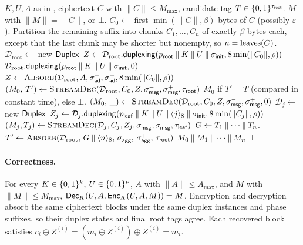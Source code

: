 \begin{algorithm}[t]
  \caption{$\Dec_K(U, A, C \concat T)$.}
  \label{alg:dec}
  \begin{algorithmic}[1]
    \Require $K, U, A$ as in , ciphertext $C$ with $\|C\| \leq M_{\max}$, candidate tag $T \in \{0,1\}^{\tau_{\mathsf{root}}}$.
    \Ensure $M$ with $\|M\| = \|C\|$, or $\bot$.
    \State $C_0 \gets$ first $\min(\|C\|, \beta)$ bytes of $C$ (possibly $\varepsilon$).
    \State Partition the remaining suffix into chunks $C_1, \dots, C_n$ of exactly $\beta$ bytes each, except that the last chunk may be shorter but nonempty, so $n = \operatorname{leaves}(C)$.
    \State $\mathcal{D}_{\text{root}} \gets$ new $\mathsf{Duplex}$
      \State $Z \gets \mathcal{D}_{\text{root}}.\mathsf{duplexing}(p_{\mathsf{root}} \mathbin{\|} K \mathbin{\|} U \mathbin{\|} \sigma_{\mathsf{init}}, 8\min(\|C_0\|, \rho))$
    \Else
      \State $\mathcal{D}_{\text{root}}.\mathsf{duplexing}(p_{\mathsf{root}} \mathbin{\|} K \mathbin{\|} U \mathbin{\|} \sigma_{\mathsf{init}}, 0)$
      \State $Z \gets \Call{Absorb}{\mathcal{D}_{\text{root}}, A, \sigadmore, \sigadlast, 8\min(\|C_0\|, \rho)}$
    \EndIf
      \State $(M_0,\, T') \gets \Call{StreamDec}{\mathcal{D}_{\text{root}}, C_0, Z, \sigmsgmore, \sigmsglast, \tauroot}$
      \State \Return $M_0$ if $T' = T$ (compared in constant time), else $\bot$.
    \EndIf
    \State $(M_0,\, \_) \gets \Call{StreamDec}{\mathcal{D}_{\text{root}}, C_0, Z, \sigmsgmore, \sigmsglast, 0}$
      \State $\mathcal{D}_j \gets$ new $\mathsf{Duplex}$
      \State $Z_j \gets \mathcal{D}_j.\mathsf{duplexing}(p_{\mathsf{leaf}} \mathbin{\|} K \mathbin{\|} U \mathbin{\|} \langle j \rangle_8 \mathbin{\|} \sigma_{\mathsf{init}}, 8\min(\|C_j\|, \rho))$
      \State $(M_j, T_j) \gets \Call{StreamDec}{\mathcal{D}_j, C_j, Z_j, \sigmsgmore, \sigmsglast, \tauleaf}$
    \EndFor
    \State $G \gets T_1 \mathbin{\|} \cdots \mathbin{\|} T_n$.
    \State $T' \gets \Call{Absorb}{\mathcal{D}_{\text{root}},\, G \concat \langle n \rangle_8,\, \sigaggmore,\, \sigagglast,\, \tauroot}$
      \State \Return $M_0 \mathbin{\|} M_1 \mathbin{\|} \cdots \mathbin{\|} M_n$
    \Else
      \State \Return $\bot$
    \EndIf
  \end{algorithmic}
\end{algorithm}

\paragraph{Correctness.}
For every $K \in \{0,1\}^k$, $U \in \{0,1\}^{\nu}$,
$A$ with $\|A\| \leq A_{\max}$, and $M$ with $\|M\| \leq M_{\max}$,
$\mathsf{Dec}_K(U, A, \mathsf{Enc}_K(U, A, M)) = M$. Encryption and decryption absorb the same
ciphertext blocks under the same duplex instances and phase suffixes, so their
duplex states and final root tags agree. Each recovered block satisfies
$c_i \oplus Z^{(i)} = (m_i \oplus Z^{(i)}) \oplus Z^{(i)} = m_i$.

